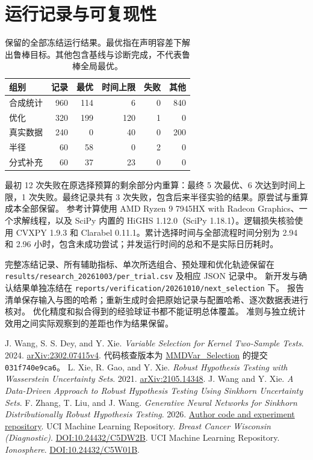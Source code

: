 \documentclass[11pt,a4paper]{article}
\begin{document}
\section{运行记录与可复现性}\label{sec:records}
\begin{table}[tbp]\centering\small\setlength{\tabcolsep}{3.5pt}
\caption{保留的全部冻结运行结果。最优指在声明容差下解出鲁棒目标。其他包含基线与诊断完成，不代表鲁棒全局最优。}\label{tab:outcomes}
\begin{tabularx}{\linewidth}{@{}Yrrrrr@{}}
\toprule 组别 & 记录 & 最优 & 时间上限 & 失败 & 其他 \\
\midrule
合成统计 & 960 & 114 & 6 & 0 & 840 \\
优化 & 320 & 199 & 120 & 1 & 0 \\
真实数据 & 240 & 0 & 40 & 0 & 200 \\
半径 & 60 & 58 & 0 & 2 & 0 \\
分式补充 & 60 & 37 & 23 & 0 & 0 \\
\bottomrule\end{tabularx}\end{table}
最初 12 次失败在原选择预算的剩余部分内重算：最终 5 次最优、6 次达到时间上限，1 次失败。最终记录共有 3 次失败，包含后来半径实验的结果。原尝试与重算成本全部保留。
参考计算使用 AMD Ryzen 9 7945HX with Radeon Graphics、一个求解线程，以及 SciPy 内置的 HiGHS 1.12.0（SciPy 1.18.1）。逻辑损失核验使用 CVXPY 1.9.3 和 Clarabel 0.11.1。累计选择时间与全部流程时间分别为 2.94 和 2.96 小时，包含未成功尝试；并发运行时间的总和不是实际日历耗时。


完整冻结记录、所有辅助指标、单次所选组合、预处理和优化轨迹保留在
\texttt{results/research\_20261003/per\_trial.csv} 及相应 JSON 记录中。
新开发与确认结果单独冻结在 \texttt{reports/verification/20261010/next\_selection} 下。
报告清单保存输入与图的哈希；重新生成时会把原始记录与配置哈希、逐次数据表进行核对。
优化精度和拟合得到的经验球证书都不能证明总体覆盖。
准则与独立统计效用之间实际观察到的差距也作为结果保留。

\FloatBarrier
\begin{thebibliography}{9}
 J. Wang, S. S. Dey, and Y. Xie.
\emph{Variable Selection for Kernel Two-Sample Tests}. 2024.
\href{https://arxiv.org/abs/2302.07415}{arXiv:2302.07415v4}.
代码核查版本为
\href{https://github.com/WalterBabyRudin/MMDVar_Selection}{MMDVar\_Selection}
的提交 \texttt{031f740e9ca6}。
 L. Xie, R. Gao, and Y. Xie.
\emph{Robust Hypothesis Testing with Wasserstein Uncertainty Sets}. 2021.
\href{https://arxiv.org/abs/2105.14348}{arXiv:2105.14348}.
 J. Wang and Y. Xie.
\emph{A Data-Driven Approach to Robust Hypothesis Testing Using Sinkhorn Uncertainty Sets}.
 F. Zhang, T. Liu, and J. Wang.
\emph{Generative Neural Networks for Sinkhorn Distributionally Robust Hypothesis Testing}. 2026.
\href{https://github.com/Arthas819/SDRHT}{Author code and experiment repository}.
 UCI Machine Learning Repository.
\emph{Breast Cancer Wisconsin (Diagnostic)}. \href{https://doi.org/10.24432/C5DW2B}{DOI:10.24432/C5DW2B}.
 UCI Machine Learning Repository.
\emph{Ionosphere}. \href{https://doi.org/10.24432/C5W01B}{DOI:10.24432/C5W01B}.
\end{thebibliography}
\end{document}
